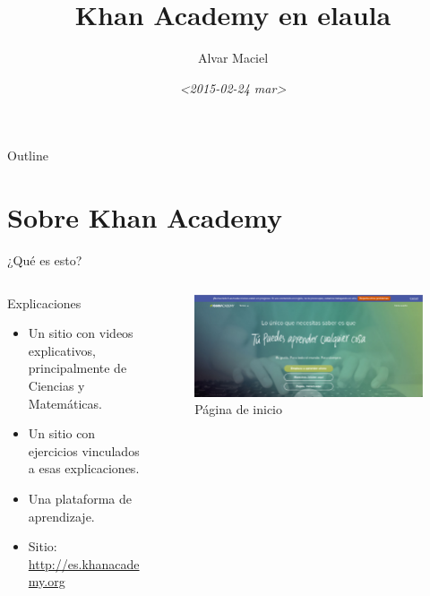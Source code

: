 \documentclass[presentation]{beamer}
\author{Alvar Maciel}
\date{\textit{<2015-02-24 mar>}}
\title{Khan Academy en elaula}
\begin{document}
\maketitle
\begin{frame}{Outline}
\tableofcontents
\end{frame}



\section{Sobre Khan Academy}
\label{sec-1}
\begin{frame}[label=sec-1-1]{¿Qué es esto?}
\begin{columns}
\begin{column}{0.6\columnwidth}
\begin{beamercolorbox}{Explicaciones}
\begin{itemize}
\item Un sitio con videos explicativos, principalmente de Ciencias y Matemáticas.
\item Un sitio con \alert{ejercicios} vinculados a esas explicaciones.
\item Una plataforma de aprendizaje.
\item Sitio: \url{http://es.khanacademy.org}
\end{itemize}
\end{beamercolorbox}
\end{column}
\begin{column}{0.4\columnwidth}
\begin{structureenv} %
\begin{figure}[htb]
\centering
\includegraphics[width=.9\linewidth]{pagInicio2.png}
\caption{Página de inicio}
\end{figure}
\end{structureenv}
\end{column}
\end{columns}
\end{frame}
\end{document}
